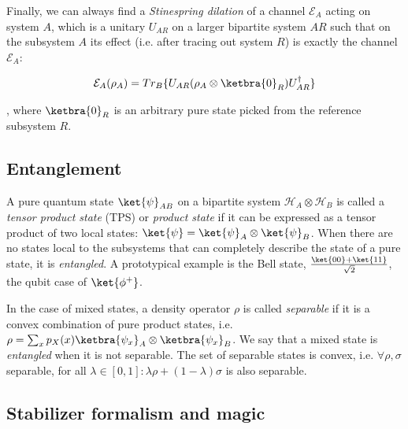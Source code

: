 Finally, we can always find a \textit{Stinespring dilation} of a channel $\mathcal{E}_A$ acting on system $A$, which is a unitary $U_{AR}$ on a larger bipartite system $AR$ such that on the subsystem $A$ its effect (i.e. after tracing out system $R$) is exactly the channel $\mathcal{E}_A$: 

\begin{align}
\mathcal{E}_A(\rho_A) = Tr_B\{ U_{AR}(\rho_A \otimes \ketbra{0}_R) U_{AR}^\dagger \}
\end{align}

, where $\ketbra{0}_R$ is an arbitrary pure state picked from the reference subsystem $R$. 

\subsection{Entanglement} 

A pure quantum state $\ket{\psi}_{AB}$ on a bipartite system $\mathcal{H}_A \otimes \mathcal{H}_B$ is called a \textit{tensor product state} (TPS) or \textit{product state} if it can be expressed as a tensor product of two local states: $\ket{\psi} = \ket{\psi}_A \otimes \ket{\psi}_B$. When there are no states local to the subsystems that can completely describe the state of a pure state, it is \textit{entangled}. A prototypical example is the Bell state, $\frac{\ket{00} + \ket{11}}{\sqrt{2}}$, the qubit case of $\ket{\phi^+}$.

In the case of mixed states, a density operator $\rho$ is called \textit{separable} if it is a convex combination of pure product states, i.e. $\rho = \sum_x p_X(x) \ketbra{\psi_x}_{A} \otimes  \ketbra{\psi_x}_{B}$. We say that a mixed state is \textit{entangled} when it is not separable. The set of separable states is convex, i.e. $\forall \rho, \sigma$ separable, for all $\lambda \in [0,1] : \lambda \rho + (1-\lambda) \sigma$ is also separable.

\subsection{Stabilizer formalism and magic} 

